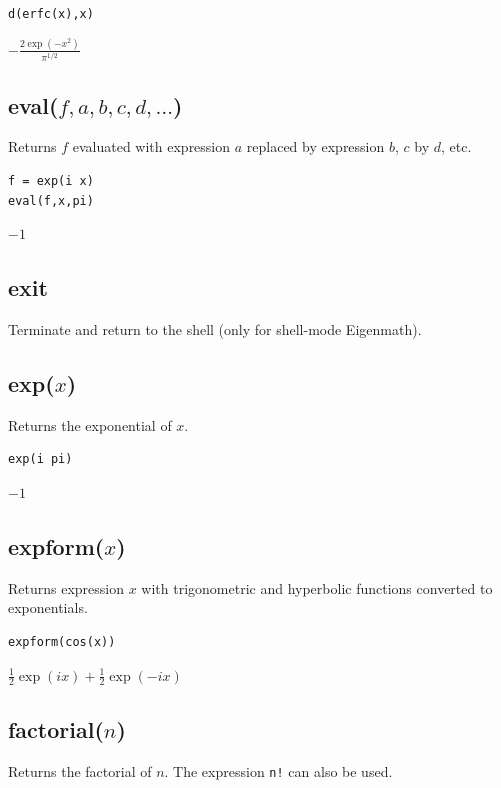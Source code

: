 \documentclass[12pt]{article}
\begin{document}
{\color{blue}
\begin{verbatim}
d(erfc(x),x)
\end{verbatim}
}

$\displaystyle -\frac{2\exp(-x^2)}{\pi^{1/2}}$

\subsection*{eval($f,a,b,c,d,\ldots$)}

Returns $f$ evaluated with expression $a$ replaced by expression $b$, $c$ by $d$, etc.

{\color{blue}
\begin{verbatim}
f = exp(i x)
eval(f,x,pi)
\end{verbatim}
}

$-1$

\subsection*{exit}

Terminate and return to the shell (only for shell-mode Eigenmath).

\subsection*{exp($x$)}

Returns the exponential of $x$.

{\color{blue}
\begin{verbatim}
exp(i pi)
\end{verbatim}
}

$-1$

\subsection*{expform($x$)}

Returns expression $x$ with trigonometric and hyperbolic functions
converted to exponentials.

{\color{blue}
\begin{verbatim}
expform(cos(x))
\end{verbatim}
}

$\tfrac{1}{2}\exp(ix)+\frac{1}{2}\exp(-ix)$

\subsection*{factorial($n$)}

Returns the factorial of $n$.
The expression \verb$n!$ can also be used.
\end{document}
